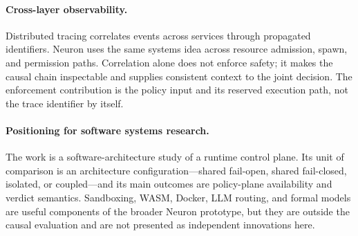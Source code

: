 \paragraph{Cross-layer observability.}
Distributed tracing correlates events across services through propagated
identifiers. Neuron uses the same systems idea across resource admission,
spawn, and permission paths. Correlation alone does not enforce safety; it
makes the causal chain inspectable and supplies consistent context to the
joint decision. The enforcement contribution is the policy input and its
reserved execution path, not the trace identifier by itself.

\paragraph{Positioning for software systems research.}
The work is a software-architecture study of a runtime control plane. Its
unit of comparison is an architecture configuration---shared fail-open,
shared fail-closed, isolated, or coupled---and its main outcomes are
policy-plane availability and verdict semantics. Sandboxing, WASM, Docker,
LLM routing, and formal models are useful components of the broader Neuron
prototype, but they are outside the causal evaluation and are not presented
as independent innovations here.
